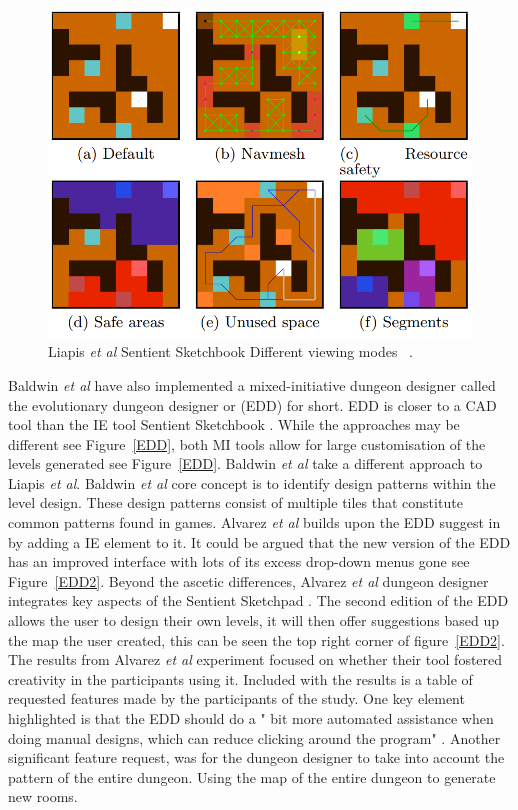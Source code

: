 \documentclass[journal]{IEEEtran}
\begin{document}
\begin{figure}[h]
	\includegraphics[width=1.0\linewidth]{SentientSketchbook2.PNG}
	\caption{Liapis \textit{et al} Sentient Sketchbook Different viewing modes ~\cite{liapis2013sentient}.}
	\label{Sketchbook2}
\end{figure} 

Baldwin \textit{et al} \cite{baldwin2017mixed} have also implemented a mixed-initiative dungeon designer called the evolutionary dungeon designer or (EDD) for short. EDD is closer to a CAD tool than the IE tool Sentient Sketchbook \cite{liapis2013sentient}.  While the approaches may be different see Figure~\ref{EDD}, both MI tools allow for large customisation of the levels generated see Figure~\ref{EDD}.  Baldwin \textit{et al} \cite{baldwin2017mixed} take a different approach to Liapis  \textit{et al}\cite{liapis2013sentient}.  Baldwin \textit{et al} \cite{baldwin2017mixed} core concept is to identify design patterns within the level design. These design patterns consist of multiple tiles that constitute common patterns found in games. Alvarez \textit{et al}\cite{alvarez2018fostering} builds upon the EDD suggest in \cite{baldwin2017mixed} by adding a IE element to it. It could be argued that the new version of the EDD has an improved interface with lots of its excess drop-down menus gone see Figure~\ref{EDD2}. Beyond the ascetic differences, Alvarez \textit{et al}\cite{alvarez2018fostering} dungeon designer integrates key aspects of  the Sentient Sketchpad \cite{liapis2013sentient}. The second edition of the EDD allows the user to design their own levels, it will then offer suggestions based up the map the user created, this can be seen the top right corner of figure~\ref{EDD2}.  The results from Alvarez \textit{et al}\cite{alvarez2018fostering} experiment focused on whether their tool fostered creativity in the participants using it. Included with the results is a table of requested features made by the participants of the study. One key element highlighted is that the EDD should do a " bit more automated assistance when doing manual designs, which can reduce clicking around the program" \cite[Table 2]{alvarez2018fostering}. Another significant  feature request, was for the dungeon designer to take into account the pattern of the entire dungeon. Using the map of the entire dungeon to generate new rooms.
\end{document}
